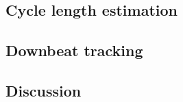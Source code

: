 \subsection{Cycle length estimation}

%
% 
%
\subsection{Downbeat tracking}

%
\subsection{Discussion}

%
%
%
